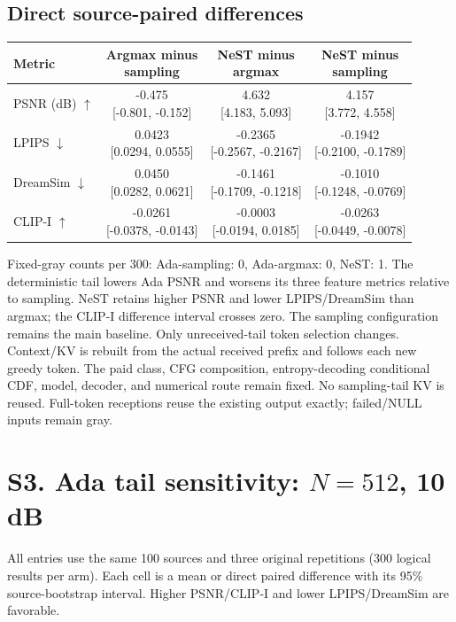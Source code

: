 \documentclass[11pt,letterpaper]{article}
\begin{document}
\subsection*{Direct source-paired differences}
\begin{center}\small\setlength{\tabcolsep}{7pt}\renewcommand{\arraystretch}{1.55}
\begin{tabular}{lccc}
\toprule
Metric & \shortstack{Argmax minus\\sampling} & \shortstack{NeST minus\\argmax} & \shortstack{NeST minus\\sampling}\\\midrule
PSNR (dB) $\uparrow$ & \shortstack{-0.475\\{}[-0.801, -0.152]} & \shortstack{4.632\\{}[4.183, 5.093]} & \shortstack{4.157\\{}[3.772, 4.558]}\\
LPIPS $\downarrow$ & \shortstack{0.0423\\{}[0.0294, 0.0555]} & \shortstack{-0.2365\\{}[-0.2567, -0.2167]} & \shortstack{-0.1942\\{}[-0.2100, -0.1789]}\\
DreamSim $\downarrow$ & \shortstack{0.0450\\{}[0.0282, 0.0621]} & \shortstack{-0.1461\\{}[-0.1709, -0.1218]} & \shortstack{-0.1010\\{}[-0.1248, -0.0769]}\\
CLIP-I $\uparrow$ & \shortstack{-0.0261\\{}[-0.0378, -0.0143]} & \shortstack{-0.0003\\{}[-0.0194, 0.0185]} & \shortstack{-0.0263\\{}[-0.0449, -0.0078]}\\
\bottomrule\end{tabular}\end{center}
Fixed-gray counts per 300: Ada-sampling: 0, Ada-argmax: 0, NeST: 1.
The deterministic tail lowers Ada PSNR and worsens its three feature metrics relative to sampling. NeST retains higher PSNR and lower LPIPS/DreamSim than argmax; the CLIP-I difference interval crosses zero. The sampling configuration remains the main baseline.
Only unreceived-tail token selection changes. Context/KV is rebuilt from the actual received prefix and follows each new greedy token. The paid class, CFG composition, entropy-decoding conditional CDF, model, decoder, and numerical route remain fixed. No sampling-tail KV is reused. Full-token receptions reuse the existing output exactly; failed/NULL inputs remain gray.
\clearpage\section*{S3. Ada tail sensitivity: $N=512$, 10 dB}
All entries use the same 100 sources and three original repetitions (300 logical results per arm). Each cell is a mean or direct paired difference with its 95\% source-bootstrap interval. Higher PSNR/CLIP-I and lower LPIPS/DreamSim are favorable.
\end{document}
